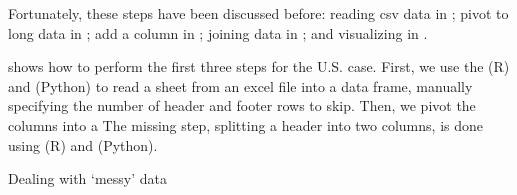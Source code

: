 Fortunately, these steps have been discussed before: reading csv data in ; pivot to long data in ;
add a column in ; joining data in ; and visualizing in .

 shows how to perform the first three steps for the U.S. case.
First, we use the  (R) and  (Python) to read a sheet from an excel file into a data frame,
manually specifying the number of header and footer rows to skip.
Then, we pivot the columns into a
The missing step, splitting a header into two columns, is done using  (R) and  (Python). 

\begin{ccsexample}
  \caption{Dealing with `messy' data}\label{ex:excel}
\end{ccsexample}
